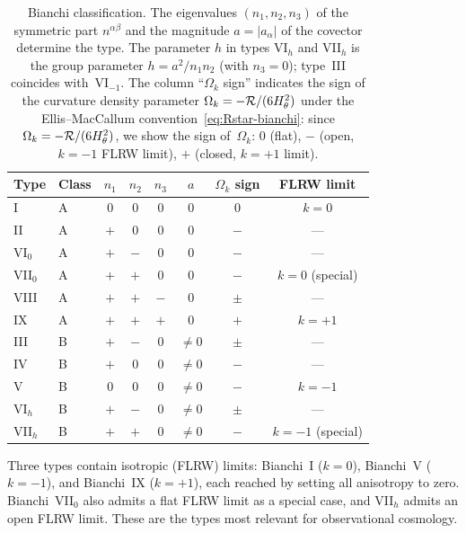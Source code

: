\begin{table}[ht]
\caption{Bianchi classification.  The eigenvalues $(n_1, n_2, n_3)$
of the symmetric part $n^{\alpha\beta}$ and the magnitude
$a = |a_\alpha|$ of the covector determine the type.  The
parameter $h$ in types VI$_h$ and VII$_h$ is the group parameter
$h = a^2/n_1 n_2$ (with $n_3 = 0$); type~III coincides
with~VI$_{-1}$.  The column ``$\Omega_k$ sign'' indicates the sign of
the curvature density parameter $\Omega_k = -\mathcal{R}/(6H_\theta^2)$ under the
Ellis--MacCallum
convention~\eqref{eq:Rstar-bianchi}: since $\Omega_k = -\mathcal{R}/(6H_\theta^2)$,
we show the sign of~$\Omega_k$: $0$ (flat), $-$ (open,
$k=-1$ FLRW limit), $+$ (closed, $k=+1$ limit).}
\label{tab:bianchi-types}
\centering\footnotesize\setlength{\tabcolsep}{3.5pt}
\begin{tabular}{llcccccc}
\toprule
Type & Class & $n_1$ & $n_2$ & $n_3$ & $a$
  & $\Omega_k$ sign & FLRW limit \\
\midrule
I      & A & $0$ & $0$ & $0$ & $0$
  & $0$ & $k = 0$ \\
II     & A & $+$ & $0$ & $0$ & $0$
  & $-$ & --- \\
VI$_0$ & A & $+$ & $-$ & $0$ & $0$
  & $-$ & --- \\
VII$_0$& A & $+$ & $+$ & $0$ & $0$
  & $-$ & $k = 0$ (special) \\
VIII   & A & $+$ & $+$ & $-$ & $0$
  & $\pm$ & --- \\
IX     & A & $+$ & $+$ & $+$ & $0$
  & $+$ & $k = +1$ \\
\midrule
III    & B & $+$ & $-$ & $0$ & $\neq 0$
  & $\pm$ & --- \\
IV     & B & $+$ & $0$ & $0$ & $\neq 0$
  & $-$ & --- \\
V      & B & $0$ & $0$ & $0$ & $\neq 0$
  & $-$ & $k = -1$ \\
VI$_h$ & B & $+$ & $-$ & $0$ & $\neq 0$
  & $\pm$ & --- \\
VII$_h$& B & $+$ & $+$ & $0$ & $\neq 0$
  & $-$ & $k = -1$ (special) \\
\bottomrule
\end{tabular}
\end{table}

Three types contain isotropic (FLRW) limits: Bianchi~I
($k = 0$), Bianchi~V ($k = -1$), and Bianchi~IX ($k = +1$),
each reached by setting all anisotropy to zero.  Bianchi~VII$_0$
also admits a flat FLRW limit as a special case, and VII$_h$
admits an open FLRW limit.  These are the types most relevant
for observational cosmology.


